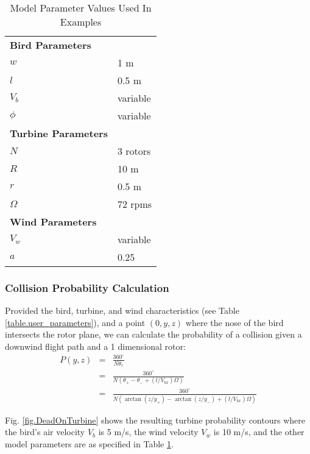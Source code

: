 \label{} \documentclass[10pt,conference]{IEEEtran}
\begin{document}
\begin{table}
  \centering
  \label{table.example_parameters}
  \vspace{1 mm}
  \begin{tabular}{|ll|}
  \hline
  \textbf{Bird Parameters} &\\
  $w$ & 1 m\\
  $l$ & 0.5 m\\
  $V_b$ & variable\\
  $\phi$ & variable\\
  \hline
  \textbf{Turbine Parameters} & \\
  $N$ & 3 rotors\\
  $R$ & 10 m\\
  $r$ & 0.5 m\\
  $\Omega$ & 72 rpms\\
  \hline
  \textbf{Wind Parameters} &\\
  $V_w$ & variable\\
  $a$ & 0.25\\
  \hline
  \end{tabular}
  \caption{Model Parameter Values Used In Examples}
\end{table}

\subsubsection{Collision Probability Calculation}
Provided the bird, turbine, and wind characteristics (see Table \ref{table.user_parameters}), and a point $(0,y,z)$
where the nose of the bird intersects the rotor plane, we can calculate the probability of a collision given a downwind
flight path and a 1 dimensional rotor:
\begin{eqnarray}\label{DownwindProbability}
    \nonumber P(y,z) &=& \frac{360^\circ}{N\theta_r}\\
    &=& \frac{360^\circ}{N(\theta_+ - \theta_- + (l/V_{bx})\Omega)}\\
    \nonumber &=& \frac{360^\circ}{N(\arctan(z/y_+) - \arctan(z/y_-) + (l/V_{bx})\Omega)}
\end{eqnarray}

Fig. \ref{fig.DeadOnTurbine} shows the resulting turbine probability contours where the bird's air velocity $V_b$ is 5
m/s, the wind velocity $V_w$ is 10 m/s, and the other model parameters are as specified in Table
\ref{table.example_parameters}.
\end{document}
